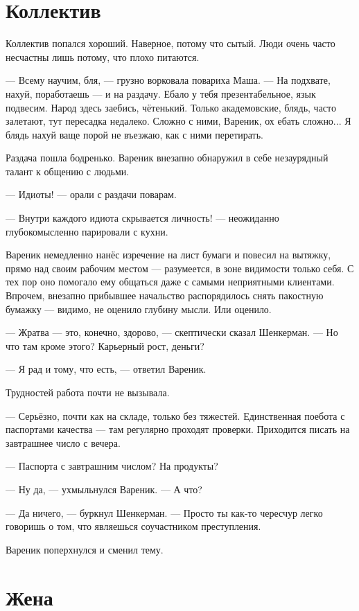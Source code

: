 \documentclass[a4paper,10pt,fleqn]{book}\usepackage{polyglossia}\setdefaultlanguage{english}\setotherlanguage{russian}\defaultfontfeatures{Ligatures=TeX,Mapping=tex-text} \usepackage{xcolor}\definecolor{lightgray}{HTML}{bbbbbb}\color{lightgray}\newcommand{\ml}[3]{\textcolor{black}{#3}}
\newcommand{\textspace}{\vspace{1em}{\centering\Large\bfseries<...>\par}\vspace{1em}}
\begin{document}
\section{Коллектив}

Коллектив попался хороший.
Наверное, потому что сытый.
Люди очень часто несчастны лишь потому, что плохо питаются.

--- Всему научим, бля, --- грузно ворковала повариха Маша.
--- На подхвате, нахуй, поработаешь --- и на раздачу.
Ебало у тебя презентабельное, язык подвесим.
Народ здесь заебись, чётенький.
Только академовские, блядь, часто залетают, тут пересадка недалеко.
Сложно с ними, Вареник, ох ебать сложно...
Я блядь нахуй ваще порой не въезжаю, как с ними перетирать.

Раздача пошла бодренько.
Вареник внезапно обнаружил в себе незаурядный талант к общению с людьми.

--- Идиоты! --- орали с раздачи поварам.

--- Внутри каждого идиота скрывается личность! --- неожиданно глубокомысленно парировали с кухни.

Вареник немедленно нанёс изречение на лист бумаги и повесил на вытяжку, прямо над своим рабочим местом --- разумеется, в зоне видимости только себя.
С тех пор оно помогало ему общаться даже с самыми неприятными клиентами.
Впрочем, внезапно прибывшее начальство распорядилось снять пакостную бумажку --- видимо, не оценило глубину мысли.
Или оценило.

\textspace

--- Жратва --- это, конечно, здорово, --- скептически сказал Шенкерман.
--- Но что там кроме этого?
Карьерный рост, деньги?

--- Я рад и тому, что есть, --- ответил Вареник.

Трудностей работа почти не вызывала.

--- Серьёзно, почти как на складе, только без тяжестей.
Единственная поебота с паспортами качества --- там регулярно проходят проверки.
Приходится писать на завтрашнее число с вечера.

--- Паспорта с завтрашним числом?
На продукты?

--- Ну да, --- ухмыльнулся Вареник.
--- А что?

--- Да ничего, --- буркнул Шенкерман.
--- Просто ты как-то чересчур легко говоришь о том, что являешься соучастником преступления.

Вареник поперхнулся и сменил тему.

\section{Жена}
\end{document}
